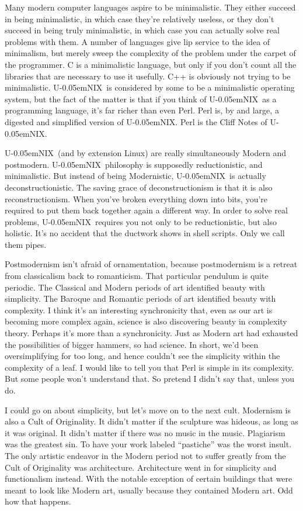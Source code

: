 \documentclass[10pt,letterpaper]{article}
\newcommand{\unix}{{\small U\kern-0.05emNIX\spacefactor1000}}
\begin{document}
Many modern computer languages aspire to be minimalistic. They either succeed
in being minimalistic, in which case they're relatively useless, or they
don't succeed in being truly minimalistic, in which case you can actually
solve real problems with them. A number of languages give lip service to the
idea of minimalism, but merely sweep the complexity of the problem under the
carpet of the programmer. C is a minimalistic language, but only if you don't
count all the libraries that are necessary to use it usefully. C++ is
obviously not trying to be minimalistic. \unix\ is considered by some to be a
minimalistic operating system, but the fact of the matter is that if you
think of \unix\ as a programming language, it's far richer than even Perl. Perl
is, by and large, a digested and simplified version of \unix. Perl is the
Cliff Notes of \unix.

\unix\ (and by extension Linux) are really simultaneously Modern and
postmodern. \unix\ philosophy is supposedly reductionistic, and minimalistic.
But instead of being Modernistic, \unix\ is actually deconstructionistic. The
saving grace of deconstructionism is that it is also reconstructionism. When
you've broken everything down into bits, you're required to put them back
together again a different way. In order to solve real problems, \unix\ requires
you not only to be reductionistic, but also holistic. It's no
accident that the ductwork shows in shell scripts. Only we call them pipes.

Postmodernism isn't afraid of ornamentation, because postmodernism is a
retreat from classicalism back to romanticism. That particular pendulum is
quite periodic. The Classical and Modern periods of art identified beauty
with simplicity. The Baroque and Romantic periods of art identified beauty
with complexity. I think it's an interesting synchronicity that, even as our
art is becoming more complex again, science is also discovering beauty in
complexity theory. Perhaps it's more than a synchronicity. Just as Modern art
had exhausted the possibilities of bigger hammers, so had science. In short,
we'd been oversimplifying for too long, and hence couldn't see the simplicity
within the complexity of a leaf. I would like to tell you that Perl is simple
in its complexity. But some people won't understand that. So pretend I didn't
say that, unless you do.

I could go on about simplicity, but let's move on to the next cult. Modernism
is also a Cult of Originality. It didn't matter if the sculpture was hideous,
as long as it was original. It didn't matter if there was no music in the
music. Plagiarism was the greatest sin. To have your work labeled
``pastiche'' was the worst insult. The only artistic endeavor in the Modern
period not to suffer greatly from the Cult of Originality was architecture.
Architecture went in for simplicity and functionalism instead. With the
notable exception of certain buildings that were meant to look like Modern
art, usually because they contained Modern art. Odd how that happens.
\end{document}
